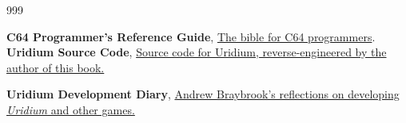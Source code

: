 \renewcommand{\bibname}{NOTES/REFERENCES}
\begin{thebibliography}{999}


  \textbf{C64 Programmer's Reference Guide},
  \href{https://archive.org/details/c64-programmer-ref}{The bible for C64 programmers}.
  \textbf{Uridium Source Code},
  \href{https://github.com/mwenge/uridium}{Source code for Uridium, reverse-engineered by the author of this book.}

  \textbf{Uridium Development Diary},
    \href{https://uridiumauthor.blogspot.com/2025/10/here-are-some-articles-i-wrote-for-free.html}{Andrew Braybrook's reflections on developing \textit{Uridium} and other games.}

\end{thebibliography}
